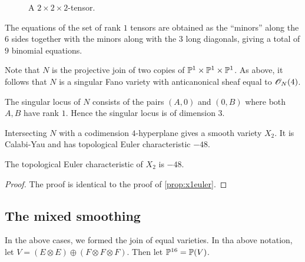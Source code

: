 \begin{figure}[t]
\centering
{}
\caption{A $2 \times 2 \times 2$-tensor.}
\label{fig:222tensor}
\end{figure}

The equations of the set of rank $1$ tensors are obtained as the ``minors'' along the $6$ sides together with the minors along with the $3$ long diagonals, giving a total of $9$ binomial equations. 

Note that $N$ is the projective join of two copies of $\P^1 \times \P^1 \times \P^1$. As above, it follows that $N$ is a singular Fano variety with anticanonical sheaf equal to $\OO_N(4)$. 

The singular locus of $N$ consists of the pairs $(A,0)$ and $(0,B)$ where both $A,B$ have rank $1$. Hence the singular locus is of dimension $3$.

Intersecting $N$ with a codimension $4$-hyperplane gives a smooth variety $X_2$. It is Calabi-Yau and has topological Euler characteristic $-48$.

\begin{proposition}
The topological Euler characteristic of $X_2$ is $-48$.
\end{proposition}
\begin{proof}
The proof is identical to the proof of \cref{prop:x1euler}.
\end{proof}

\subsection{The mixed smoothing}

In the above cases, we formed the join of equal varieties. In tha above notation, let $V=(E \otimes E) \oplus (F \otimes F \otimes F)$. Then let $\P^{16}=\P(V)$.

